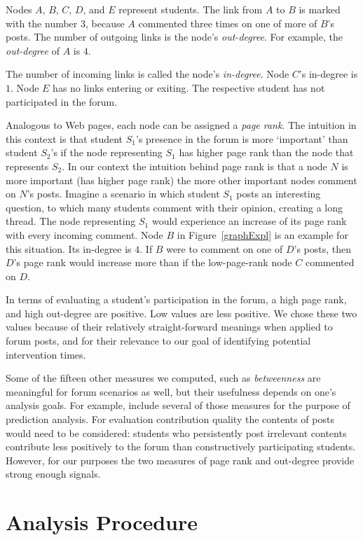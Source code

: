 Nodes $A$, $B$, $C$, $D$, and $E$ represent students. The link from
$A$ to $B$ is marked with the number $3$, because $A$ commented three
times on one of more of $B$'s posts. The number of outgoing links is
the node's {\em out-degree}. For example, the {\em out-degree} of $A$
is $4$.

The number of incoming links is called the node's {\em
  in-degree}. Node $C$'s in-degree is $1$. Node $E$ has no links
entering or exiting. The respective student has not participated in
the forum.

Analogous to Web pages, each node can be assigned a {\em page
  rank}. The intuition in this context is that student $S_1$'s
presence in the forum is more `important' than student $S_2$'s if the
node representing $S_1$ has higher page rank than the node that
represents $S_2$. In our context the intuition behind page rank is
that a node $N$ is more important (has higher page rank) the more
other important nodes comment on $N$'s posts. Imagine a scenario
in which student $S_1$ posts an interesting question, to which many
students comment with their opinion, creating a long thread. The node
representing $S_1$ would experience an increase of its page rank with
every incoming comment. Node $B$ in Figure~\ref{graphExpl} is an
example for this situation. Its in-degree is $4$. If $B$ were to
comment on one of $D$'s posts, then $D$'s page rank would increase
more than if the low-page-rank node $C$ commented on $D$.

In terms of evaluating a student's participation in the forum, a high
page rank, and high out-degree are positive. Low values are less
positive. We chose these two values because of their relatively
straight-forward meanings when applied to forum posts, and for their
relevance to our goal of identifying potential intervention times.

Some of the fifteen other measures we computed, such as {\em
  betweenness} are meaningful for forum scenarios as well, but their
usefulness depends on one's analysis goals. For example,
\cite{yang2013} include several of those measures for the purpose of
prediction analysis. For evaluation contribution quality the contents
of posts would need to be considered: students who persistently post
irrelevant contents contribute less positively to the forum than
constructively participating students. However, for our purposes the
two measures of page rank and out-degree provide strong enough
signals.

\section{Analysis Procedure}


